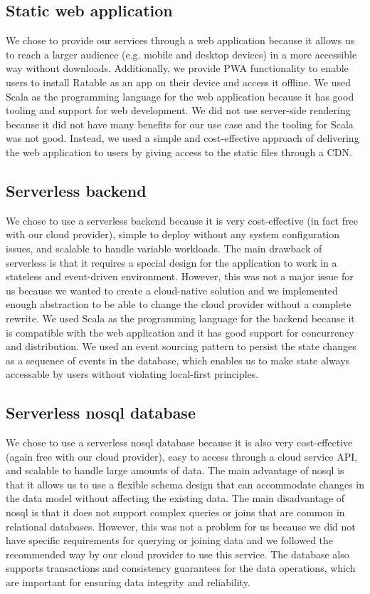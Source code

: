 \documentclass[
	ngerman,
	ruledheaders=section,   %
	class=report,		    %
	thesis={type=bachelor}, %
	accentcolor=9c,			%
	custommargins=true,    %
	marginpar=false,        %
	parskip=half-,          %
	fontsize=11pt,          %
]{tudapub}
\begin{document}
\subsection{Static web application}
We chose to provide our services through a web application because it allows us to reach a larger audience (e.g. mobile and desktop devices) in a more accessible way without downloads. Additionally, we provide PWA functionality to enable users to install Ratable as an app on their device and access it offline. We used Scala as the programming language for the web application because it has good tooling and support for web development. We did not use server-side rendering because it did not have many benefits for our use case and the tooling for Scala was not good. Instead, we used a simple and cost-effective approach of delivering the web application to users by giving access to the static files through a CDN.

\subsection{Serverless backend} 
We chose to use a serverless backend because it is very cost-effective (in fact free with our cloud provider), simple to deploy without any system configuration issues, and scalable to handle variable workloads. The main drawback of serverless is that it requires a special design for the application to work in a stateless and event-driven environment. However, this was not a major issue for us because we wanted to create a cloud-native solution and we implemented enough abstraction to be able to change the cloud provider without a complete rewrite. We used Scala as the programming language for the backend because it is compatible with the web application and it has good support for concurrency and distribution. We used an event sourcing pattern to persist the state changes as a sequence of events in the database, which enables us to make state always accessable by users without violating local-first principles.

\subsection{Serverless nosql database} 
We chose to use a serverless nosql database because it is also very cost-effective (again free with our cloud provider), easy to access through a cloud service API, and scalable to handle large amounts of data. The main advantage of nosql is that it allows us to use a flexible schema design that can accommodate changes in the data model without affecting the existing data. The main disadvantage of nosql is that it does not support complex queries or joins that are common in relational databases. However, this was not a problem for us because we did not have specific requirements for querying or joining data and we followed the recommended way by our cloud provider to use this service. The database also supports transactions and consistency guarantees for the data operations, which are important for ensuring data integrity and reliability.
\end{document}
